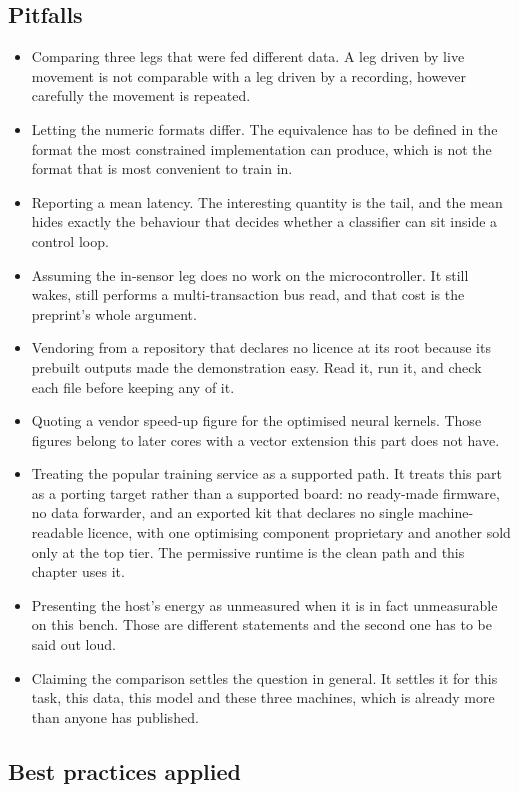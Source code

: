 \subsection*{Pitfalls}

\begin{itemize}
\item Comparing three legs that were fed different data. A leg driven by live
movement is not comparable with a leg driven by a recording, however carefully
the movement is repeated.
\item Letting the numeric formats differ. The equivalence has to be defined in
the format the most constrained implementation can produce, which is not the
format that is most convenient to train in.
\item Reporting a mean latency. The interesting quantity is the tail, and the
mean hides exactly the behaviour that decides whether a classifier can sit
inside a control loop.
\item Assuming the in-sensor leg does no work on the microcontroller. It still
wakes, still performs a multi-transaction bus read, and that cost is the
preprint's whole argument.
\item Vendoring from a repository that declares no licence at its root because
its prebuilt outputs made the demonstration easy. Read it, run it, and check
each file before keeping any of it.
\item Quoting a vendor speed-up figure for the optimised neural kernels. Those
figures belong to later cores with a vector extension this part does not have.
\item Treating the popular training service as a supported path. It treats this
part as a porting target rather than a supported board: no ready-made firmware,
no data forwarder, and an exported kit that declares no single machine-readable
licence, with one optimising component proprietary and another sold only at the
top tier. The permissive runtime is the clean path and this chapter uses it.
\item Presenting the host's energy as unmeasured when it is in fact
unmeasurable on this bench. Those are different statements and the second one
has to be said out loud.
\item Claiming the comparison settles the question in general. It settles it for
this task, this data, this model and these three machines, which is already more
than anyone has published.
\end{itemize}

\subsection*{Best practices applied}

